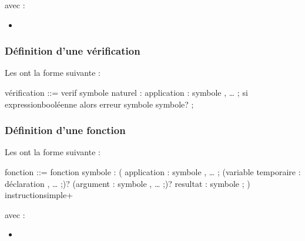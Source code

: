 \documentclass[letterpaper,10pt,french]{sphinxmanual}
\begin{document}
\sphinxAtStartPar
avec :
\begin{itemize}
\item {} 
\sphinxAtStartPar
{}

\end{itemize}


\subsubsection{Définition d’une vérification}
\label{\detokenize{syntax:definition-d-une-verification}}
\sphinxAtStartPar
Les  ont la forme suivante :

\begin{sphinxVerbatim}[commandchars=\\\{\}]
\PYGZlt{}vérification\PYGZgt{} ::= 
  verif \PYGZlt{}symbole\PYGZgt{} \PYGZlt{}naturel\PYGZgt{} : 
  application : \PYGZlt{}symbole\PYGZgt{} , … ; 
  si \PYGZlt{}expression\PYGZti{}booléenne\PYGZgt{}
  alors erreur \PYGZlt{}symbole\PYGZgt{} \PYGZlt{}symbole\PYGZgt{}?
  ;
\end{sphinxVerbatim}


\subsubsection{Définition d’une fonction}
\label{\detokenize{syntax:definition-d-une-fonction}}
\sphinxAtStartPar
Les  ont la forme suivante :

\begin{sphinxVerbatim}[commandchars=\\\{\}]
\PYGZlt{}fonction\PYGZgt{} ::= 
   fonction \PYGZlt{}symbole\PYGZgt{} : 
    ( 
      application : \PYGZlt{}symbole\PYGZgt{} , … ; 
      \PYGZca{}\PYGZca{} (variable temporaire : \PYGZlt{}déclaration\PYGZgt{} , … ;)? 
      \PYGZca{}\PYGZca{} (argument : \PYGZlt{}symbole\PYGZgt{} , … ;)? 
      \PYGZca{}\PYGZca{} resultat : \PYGZlt{}symbole\PYGZgt{} ; 
    ) 
    \PYGZlt{}instruction\PYGZti{}simple\PYGZgt{}+
\end{sphinxVerbatim}

\sphinxAtStartPar
avec :
\begin{itemize}
\item {} 
\sphinxAtStartPar
{}

\end{itemize}
\end{document}
